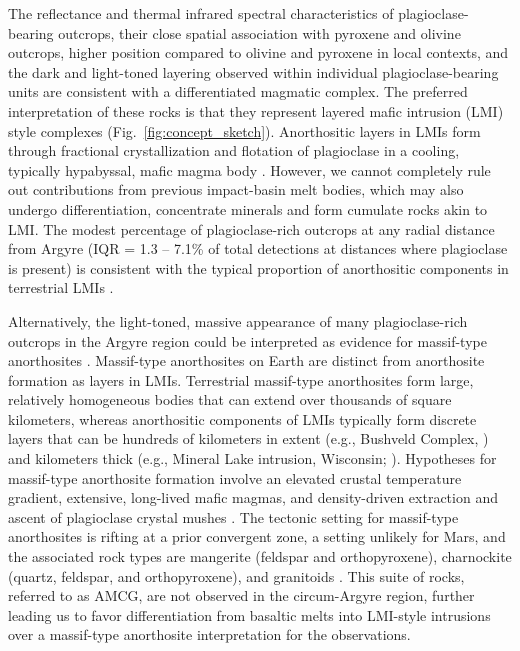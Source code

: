 \documentclass[12pt]{article}
\begin{document}
The reflectance and thermal infrared spectral characteristics of plagioclase-bearing outcrops, their close spatial association with pyroxene and olivine outcrops, higher position compared to olivine and pyroxene in local contexts, and the dark and light-toned layering observed within individual plagioclase-bearing units are consistent with a differentiated magmatic complex. The preferred interpretation of these rocks is that they represent layered mafic intrusion (LMI) style complexes (Fig.~\ref{fig:concept_sketch}). Anorthositic layers in LMIs form through fractional crystallization and flotation of plagioclase in a cooling, typically hypabyssal, mafic magma body \citep{Ashwal1993}. However, we cannot completely rule out contributions from previous impact-basin melt bodies, which may also undergo differentiation, concentrate minerals and form cumulate rocks akin to LMI. The modest percentage of plagioclase-rich outcrops at any radial distance from Argyre (IQR = 1.3 -- 7.1\% of total detections at distances where plagioclase is present) is consistent with the typical proportion of anorthositic components in terrestrial LMIs \citep{Ashwal1993, Ashwal2021}.

Alternatively, the light-toned, massive appearance of many plagioclase-rich outcrops in the Argyre region could be interpreted as evidence for massif-type anorthosites \citep{Ashwal1993, Arndt2013, Keller2024}. Massif-type anorthosites on Earth are distinct from anorthosite formation as layers in LMIs. Terrestrial massif-type anorthosites form large, relatively homogeneous bodies that can extend over thousands of square kilometers, whereas anorthositic components of LMIs typically form discrete layers that can be hundreds of kilometers in extent (e.g., Bushveld Complex, \citealt{Latypov2020}) and kilometers thick (e.g., Mineral Lake intrusion, Wisconsin; \citealt{Ashwal1993}). Hypotheses for massif-type anorthosite formation involve an elevated crustal temperature gradient, extensive, long-lived mafic magmas, and density-driven extraction and ascent of plagioclase crystal mushes \citep{Emslie1994, Keller2024}. The tectonic setting for massif-type anorthosites is rifting at a prior convergent zone, a setting unlikely for Mars, and the associated rock types are mangerite (feldspar and orthopyroxene), charnockite (quartz, feldspar, and orthopyroxene), and granitoids \citep{Emslie1994, Hamilton2010, Arndt2013, Keller2024}. This suite of rocks, referred to as AMCG, are not observed in the circum-Argyre region, further leading us to favor differentiation from basaltic melts into LMI-style intrusions over a massif-type anorthosite interpretation for the observations.
\end{document}

